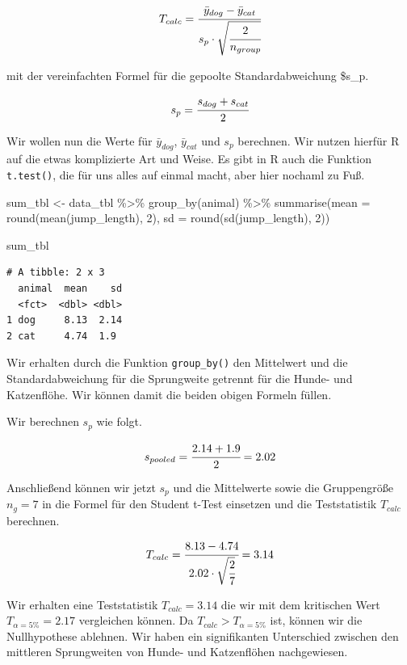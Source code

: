 \documentclass[
  letterpaper,
]{scrbook}
\newenvironment{Shaded}{\begin{snugshade}}{\end{snugshade}}
\newcommand{\AttributeTok}[1]{\textcolor[rgb]{0.40,0.45,0.13}{#1}}
\newcommand{\DecValTok}[1]{\textcolor[rgb]{0.68,0.00,0.00}{#1}}
\newcommand{\FunctionTok}[1]{\textcolor[rgb]{0.28,0.35,0.67}{#1}}
\newcommand{\NormalTok}[1]{\textcolor[rgb]{0.00,0.23,0.31}{#1}}
\newcommand{\OtherTok}[1]{\textcolor[rgb]{0.00,0.23,0.31}{#1}}
\newcommand{\SpecialCharTok}[1]{\textcolor[rgb]{0.37,0.37,0.37}{#1}}
\begin{document}
\[
T_{calc} = \cfrac{\bar{y}_{dog}-\bar{y}_{cat}}{s_{p} \cdot \sqrt{\cfrac{2}{n_{group}}}}
\]

mit der vereinfachten Formel für die gepoolte Standardabweichung \$s\_p.

\[
s_{p} = \cfrac{s_{dog} + s_{cat}}{2}
\]

Wir wollen nun die Werte für \(\bar{y}_{dog}\), \(\bar{y}_{cat}\) und
\(s_{p}\) berechnen. Wir nutzen hierfür R auf die etwas komplizierte Art
und Weise. Es gibt in R auch die Funktion \texttt{t.test()}, die für uns
alles auf einmal macht, aber hier nochaml zu Fuß.

\begin{Shaded}
\begin{Highlighting}[]
\NormalTok{sum\_tbl }\OtherTok{\textless{}{-}}\NormalTok{ data\_tbl }\SpecialCharTok{\%\textgreater{}\%} 
  \FunctionTok{group\_by}\NormalTok{(animal) }\SpecialCharTok{\%\textgreater{}\%} 
  \FunctionTok{summarise}\NormalTok{(}\AttributeTok{mean =} \FunctionTok{round}\NormalTok{(}\FunctionTok{mean}\NormalTok{(jump\_length), }\DecValTok{2}\NormalTok{), }
            \AttributeTok{sd =} \FunctionTok{round}\NormalTok{(}\FunctionTok{sd}\NormalTok{(jump\_length), }\DecValTok{2}\NormalTok{)) }

\NormalTok{sum\_tbl}
\end{Highlighting}
\end{Shaded}

\begin{verbatim}
# A tibble: 2 x 3
  animal  mean    sd
  <fct>  <dbl> <dbl>
1 dog     8.13  2.14
2 cat     4.74  1.9 
\end{verbatim}

Wir erhalten durch die Funktion \texttt{group\_by()} den Mittelwert und
die Standardabweichung für die Sprungweite getrennt für die Hunde- und
Katzenflöhe. Wir können damit die beiden obigen Formeln füllen.

Wir berechnen \(s_p\) wie folgt.

\[
s_{pooled} = \cfrac{2.14 + 1.9}{2} = 2.02
\]

Anschließend können wir jetzt \(s_p\) und die Mittelwerte sowie die
Gruppengröße \(n_g = 7\) in die Formel für den Student t-Test einsetzen
und die Teststatistik \(T_{calc}\) berechnen.

\[
T_{calc} = \cfrac{8.13- 4.74}{2.02 \cdot \sqrt{\cfrac{2}{7}}} = 3.14
\]

Wir erhalten eine Teststatistik \(T_{calc} = 3.14\) die wir mit dem
kritischen Wert \(T_{\alpha = 5\%} = 2.17\) vergleichen können. Da
\(T_{calc} > T_{\alpha = 5\%}\) ist, können wir die Nullhypothese
ablehnen. Wir haben ein signifikanten Unterschied zwischen den mittleren
Sprungweiten von Hunde- und Katzenflöhen nachgewiesen.
\end{document}
